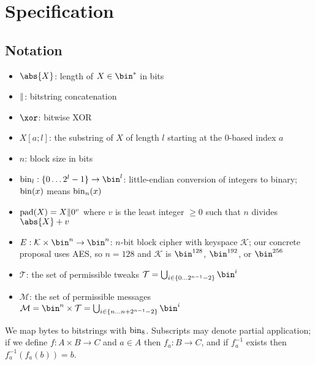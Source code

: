 \documentclass[hctr.tex]{subfiles}
\begin{document}
\section{Specification}\label{specification}
\subsection{Notation}
\begin{itemize}
    \item $\abs{X}$: length of $X \in \bin^{*}$ in bits
    \item $\Vert$: bitstring concatenation
    \item \(\xor\): bitwise XOR
    \item $X[a;l]$: the substring of $X$ of length $l$ starting at the 0-based index $a$
    \item \(n\): block size in bits
    \item $\fromint_l: \{0 \ldots 2^l-1\} \rightarrow \bin^l$:
    little-endian conversion of integers to binary; 
    \(\operatorname{bin}(x)\) means \(\operatorname{bin}_n(x)\)
    \item $\operatorname{pad}(X) = X \Vert 0^v$
    where $v$ is the least integer $\geq 0$ such that $n$ divides $\abs{X} + v$
    \item \(E: \mathcal{K} \times \bin^n \rightarrow \bin^n\): 
    \(n\)-bit block cipher with keyspace \(\mathcal{K}\);
    our concrete proposal uses AES\cite{aes},
    so \(n=128\) and \(\mathcal{K}\) is
    \(\bin^{128}\), \(\bin^{192}\), or \(\bin^{256}\)
    \item \(\mathcal{T}\): the set of permissible tweaks
    \(\mathcal{T} = \bigcup_{i \in \{0\ldots2^{n-1}-2\}}\bin^i\)
    \item \(\mathcal{M}\): the set of permissible messages
    \(\mathcal{M} = \bin^n \times \mathcal{T} = \bigcup_{i \in \{n\ldots n + 2^{n-1}-2\}}\bin^i\)
\end{itemize}
We map bytes to bitstrings with \(\operatorname{bin}_8\). Subscripts may denote partial application; if we define $f: A \times B \rightarrow C$ and
$a \in A$ then $f_a: B \rightarrow C$, and if $f_a^{-1}$ exists then $f_a^{-1}(f_a(b)) = b$.
\end{document}
